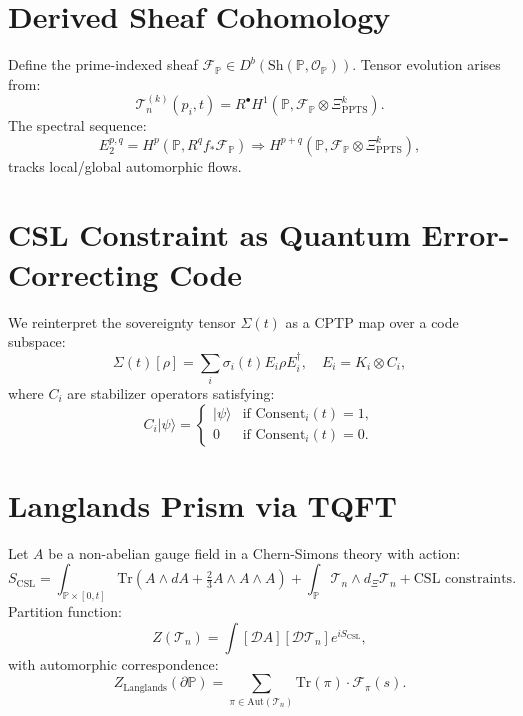 \documentclass[11pt]{article}
\begin{document}
\section{Derived Sheaf Cohomology}
Define the prime-indexed sheaf $\mathcal{F}_\mathbb{P} \in D^b(\text{Sh}(\mathbb{P}, \mathcal{O}_\mathbb{P}))$. Tensor evolution arises from:
\begin{equation}
\mathcal{T}_n^{(k)}(p_i, t) = R^\bullet H^1(\mathbb{P}, \mathcal{F}_\mathbb{P} \otimes \Xi_{\text{PPTS}}^k).
\end{equation}
The spectral sequence:
\begin{equation}
E_2^{p,q} = H^p(\mathbb{P}, R^q f_* \mathcal{F}_\mathbb{P}) \Rightarrow H^{p+q}(\mathbb{P}, \mathcal{F}_\mathbb{P} \otimes \Xi_{\text{PPTS}}^k),
\end{equation}
tracks local/global automorphic flows.

\section{CSL Constraint as Quantum Error-Correcting Code}
We reinterpret the sovereignty tensor $\Sigma(t)$ as a CPTP map over a code subspace:
\begin{equation}
\Sigma(t)[\rho] = \sum_i \sigma_i(t) E_i \rho E_i^\dagger, \quad E_i = K_i \otimes C_i,
\end{equation}
where $C_i$ are stabilizer operators satisfying:
\begin{equation}
C_i |\psi\rangle = \begin{cases}
|\psi\rangle & \text{if } \text{Consent}_i(t) = 1, \\
0 & \text{if } \text{Consent}_i(t) = 0.
\end{cases}
\end{equation}

\section{Langlands Prism via TQFT}
Let $A$ be a non-abelian gauge field in a Chern-Simons theory with action:
\begin{equation}
S_{\text{CSL}} = \int_{\mathbb{P} \times [0,t]} \text{Tr}(A \wedge dA + \tfrac{2}{3} A \wedge A \wedge A) + \int_{\mathbb{P}} \mathcal{T}_n \wedge d_\Xi \mathcal{T}_n + \text{CSL constraints}.
\end{equation}
Partition function:
\begin{equation}
Z(\mathcal{T}_n) = \int [\mathcal{D}A][\mathcal{D}\mathcal{T}_n] e^{i S_{\text{CSL}}},
\end{equation}
with automorphic correspondence:
\begin{equation}
Z_{\text{Langlands}}(\partial \mathbb{P}) = \sum_{\pi \in \text{Aut}(\mathcal{T}_n)} \text{Tr}(\pi) \cdot \mathcal{F}_\pi(s).
\end{equation}
\end{document}
